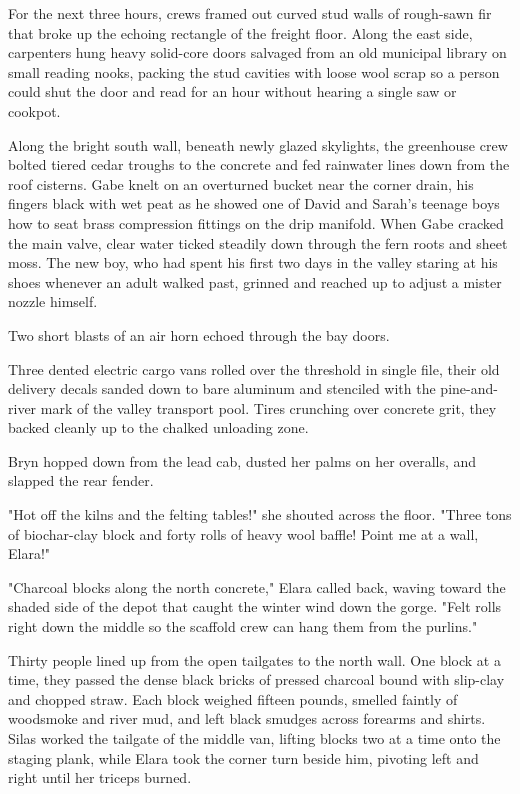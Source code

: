 For the next three hours, crews framed out curved stud walls of rough-sawn fir that broke up the echoing rectangle of the freight floor. Along the east side, carpenters hung heavy solid-core doors salvaged from an old municipal library on small reading nooks, packing the stud cavities with loose wool scrap so a person could shut the door and read for an hour without hearing a single saw or cookpot.

Along the bright south wall, beneath newly glazed skylights, the greenhouse crew bolted tiered cedar troughs to the concrete and fed rainwater lines down from the roof cisterns. Gabe knelt on an overturned bucket near the corner drain, his fingers black with wet peat as he showed one of David and Sarah's teenage boys how to seat brass compression fittings on the drip manifold. When Gabe cracked the main valve, clear water ticked steadily down through the fern roots and sheet moss. The new boy, who had spent his first two days in the valley staring at his shoes whenever an adult walked past, grinned and reached up to adjust a mister nozzle himself.

Two short blasts of an air horn echoed through the bay doors.

Three dented electric cargo vans rolled over the threshold in single file, their old delivery decals sanded down to bare aluminum and stenciled with the pine-and-river mark of the valley transport pool. Tires crunching over concrete grit, they backed cleanly up to the chalked unloading zone.

Bryn hopped down from the lead cab, dusted her palms on her overalls, and slapped the rear fender.

"Hot off the kilns and the felting tables!" she shouted across the floor. "Three tons of biochar-clay block and forty rolls of heavy wool baffle! Point me at a wall, Elara!"

"Charcoal blocks along the north concrete," Elara called back, waving toward the shaded side of the depot that caught the winter wind down the gorge. "Felt rolls right down the middle so the scaffold crew can hang them from the purlins."

Thirty people lined up from the open tailgates to the north wall. One block at a time, they passed the dense black bricks of pressed charcoal bound with slip-clay and chopped straw. Each block weighed fifteen pounds, smelled faintly of woodsmoke and river mud, and left black smudges across forearms and shirts. Silas worked the tailgate of the middle van, lifting blocks two at a time onto the staging plank, while Elara took the corner turn beside him, pivoting left and right until her triceps burned.

